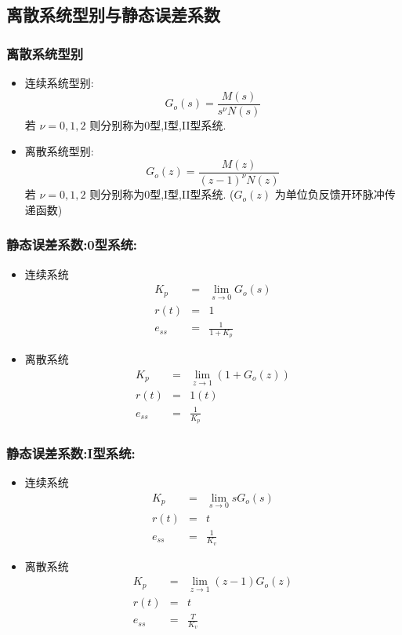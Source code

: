 \documentclass[table]{beamer}
\begin{document}
\subsection{离散系统型别与静态误差系数}
\label{sec-6-2}
\begin{frame}
\frametitle{离散系统型别}
\label{sec-6-2-1}

\begin{itemize}
\item 连续系统型别:  
       \[G_o(s)=\frac{M(s)}{s^{\nu}N(s)}\]  
      若  $\nu=0,1,2$  则分别称为0型,I型,II型系统.
\item <2->离散系统型别:  
       \[G_o(z)=\frac{M(z)}{(z-1)^{\nu}N(z)}\]  
      若  $\nu=0,1,2$  则分别称为0型,I型,II型系统.
       ($G_o(z)$  为单位负反馈开环脉冲传递函数)
\end{itemize}
\end{frame}
\begin{frame}
\frametitle{静态误差系数:0型系统:}
\label{sec-6-2-2}
\begin{itemize}

\item 连续系统
\label{sec-6-2-2-1}%
\begin{eqnarray*}
K_p &=& \lim_{s\rightarrow 0}G_o(s)  \\
r(t)&=& 1 \\
e_{ss} &=& \frac{1}{1+K_p} 
\end{eqnarray*}

\item 离散系统
\label{sec-6-2-2-2}%
\begin{eqnarray*}
K_p &=& \lim_{z\rightarrow 1}(1+G_o(z))  \\
r(t)&=& 1(t) \\
e_{ss} &=& \frac{1}{K_p} 
\end{eqnarray*}
\end{itemize} %
\end{frame}
\begin{frame}
\frametitle{静态误差系数:I型系统:}
\label{sec-6-2-3}
\begin{itemize}

\item 连续系统
\label{sec-6-2-3-1}%
\begin{eqnarray*}
K_p &=& \lim_{s\rightarrow 0}sG_o(s)  \\
r(t)&=& t \\
e_{ss} &=& \frac{1}{K_v} 
\end{eqnarray*}

\item 离散系统
\label{sec-6-2-3-2}%
\begin{eqnarray*}
K_p &=& \lim_{z\rightarrow 1} (z-1)G_o(z)  \\
r(t)&=& t \\
e_{ss} &=& \frac{T}{K_v} 
\end{eqnarray*}
\end{itemize} %
\end{frame}
\end{document}
